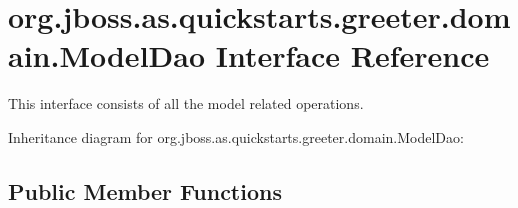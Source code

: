 \hypertarget{interfaceorg_1_1jboss_1_1as_1_1quickstarts_1_1greeter_1_1domain_1_1_model_dao}{}\section{org.\+jboss.\+as.\+quickstarts.\+greeter.\+domain.\+Model\+Dao Interface Reference}
\label{interfaceorg_1_1jboss_1_1as_1_1quickstarts_1_1greeter_1_1domain_1_1_model_dao}


This interface consists of all the model related operations.  




Inheritance diagram for org.\+jboss.\+as.\+quickstarts.\+greeter.\+domain.\+Model\+Dao\+:
\subsection*{Public Member Functions}
